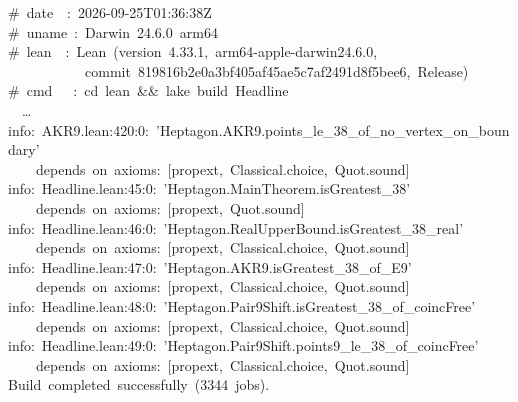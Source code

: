 \begingroup\footnotesize\ttfamily\setlength{\parindent}{0pt}\raggedright
\mbox{}\#~date~~:~2026-09-25T01:36:38Z\\
\mbox{}\#~uname~:~Darwin~24.6.0~arm64\\
\mbox{}\#~lean~~:~Lean~(version~4.33.1,~arm64-apple-darwin24.6.0,\\
\mbox{}~~~~~~~~~~~commit~819816b2e0a3bf405af45ae5c7af2491d8f5bee6,~Release)\\
\mbox{}\#~cmd~~~:~cd~lean~\&\&~lake~build~Headline\\
\mbox{}~~\dots\\
\mbox{}info:~AKR9.lean:420:0:~'Heptagon.AKR9.points\_le\_38\_of\_no\_vertex\_on\_boundary'~\\
\mbox{}~~~~depends~on~axioms:~[propext,~Classical.choice,~Quot.sound]\\[2pt]
\mbox{}info:~Headline.lean:45:0:~'Heptagon.MainTheorem.isGreatest\_38'~\\
\mbox{}~~~~depends~on~axioms:~[propext,~Quot.sound]\\[2pt]
\mbox{}info:~Headline.lean:46:0:~'Heptagon.RealUpperBound.isGreatest\_38\_real'~\\
\mbox{}~~~~depends~on~axioms:~[propext,~Classical.choice,~Quot.sound]\\[2pt]
\mbox{}info:~Headline.lean:47:0:~'Heptagon.AKR9.isGreatest\_38\_of\_E9'~\\
\mbox{}~~~~depends~on~axioms:~[propext,~Classical.choice,~Quot.sound]\\[2pt]
\mbox{}info:~Headline.lean:48:0:~'Heptagon.Pair9Shift.isGreatest\_38\_of\_coincFree'~\\
\mbox{}~~~~depends~on~axioms:~[propext,~Classical.choice,~Quot.sound]\\[2pt]
\mbox{}info:~Headline.lean:49:0:~'Heptagon.Pair9Shift.points9\_le\_38\_of\_coincFree'~\\
\mbox{}~~~~depends~on~axioms:~[propext,~Classical.choice,~Quot.sound]\\[2pt]
\mbox{}Build~completed~successfully~(3344~jobs).\\
\par\endgroup
\par\smallskip{}

